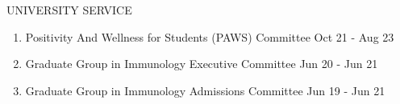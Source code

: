 \documentclass{resume} %
\begin{document}


\begin{rSection}{UNIVERSITY SERVICE}
\begin{enumerate}

\item Positivity And Wellness for Students (PAWS) Committee
\hfill Oct 21 - Aug 23
\item Graduate Group in Immunology Executive Committee
\hfill Jun 20 - Jun 21
\item Graduate Group in Immunology Admissions Committee
\hfill Jun 19 - Jun 21

\end{enumerate}
\end{rSection}
\end{document}
